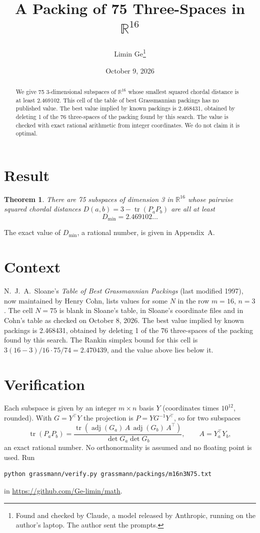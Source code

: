 \documentclass[11pt,a4paper]{article}
\title{A Packing of 75 Three-Spaces in $\mathbb{R}^{16}$}
\author{Limin Ge\thanks{Found and checked by Claude, a model released by Anthropic, running on the author's laptop. The author sent the prompts.}}
\date{October 9, 2026}
\newtheorem*{theorem}{Theorem}
\begin{document}
\maketitle
\begin{abstract}
We give 75 3-dimensional subspaces of $\mathbb{R}^{16}$ whose smallest squared chordal distance is at least 2.469102. This cell of the table of best Grassmannian packings has no published value. The best value implied by known packings is 2.468431, obtained by deleting 1 of the 76 three-spaces of the packing found by this search. The value is checked with exact rational arithmetic from integer coordinates. We do not claim it is optimal.
\end{abstract}

\section{Result}
\begin{theorem}
There are 75 subspaces of dimension 3 in $\mathbb{R}^{16}$ whose pairwise squared chordal distances $D(a,b) = 3 - \operatorname{tr}(P_aP_b)$ are all at least
\[ D_{\min} = 2.469102\ldots \]
\end{theorem}
The exact value of $D_{\min}$, a rational number, is given in Appendix~A.


\section{Context}
N.~J.~A.~Sloane's \emph{Table of Best Grassmannian Packings} (last modified 1997), now maintained by Henry Cohn, lists values for some $N$ in the row $m=16$, $n=3$. The cell $N=75$ is blank in Sloane's table, in Sloane's coordinate files and in Cohn's table as checked on October 8, 2026. The best value implied by known packings is 2.468431, obtained by deleting 1 of the 76 three-spaces of the packing found by this search. The Rankin simplex bound for this cell is $3(16-3)/16\cdot 75/74 = 2.470439$, and the value above lies below it.


\section{Verification}
Each subspace is given by an integer $m\times n$ basis $Y$ (coordinates times $10^{12}$, rounded). With $G=Y^\top Y$ the projection is $P=YG^{-1}Y^\top$, so for two subspaces
\[ \operatorname{tr}(P_aP_b)=\frac{\operatorname{tr}(\operatorname{adj}(G_a)\,A\,\operatorname{adj}(G_b)\,A^\top)}{\det G_a\det G_b},\qquad A=Y_a^\top Y_b, \]
an exact rational number. No orthonormality is assumed and no floating point is used. Run
\begin{verbatim}
python grassmann/verify.py grassmann/packings/m16n3N75.txt
\end{verbatim}
in \url{https://github.com/Ge-limin/math}.
\end{document}
